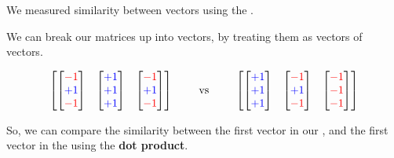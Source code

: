         We measured similarity between vectors using the .

        We can break our matrices up into vectors, by treating them as vectors of vectors.

        \begin{equation}
            \begin{bmatrix}
                \begin{bmatrix}
                    \textcolor{red}{-1} \\ \textcolor{blue}{+1} \\ \textcolor{red}{-1}
                \end{bmatrix} & 
                \begin{bmatrix}
                    \textcolor{blue}{+1} \\ \textcolor{blue}{+1} \\ \textcolor{blue}{+1}
                \end{bmatrix} & 
                \begin{bmatrix}
                    \textcolor{red}{-1} \\ \textcolor{blue}{+1} \\ \textcolor{red}{-1} 
                \end{bmatrix} 
            \end{bmatrix}
            \qquad\text{ vs } \qquad
            \begin{bmatrix}
                \begin{bmatrix}
                    \textcolor{blue}{+1} \\ \textcolor{blue}{+1} \\ \textcolor{blue}{+1}
                \end{bmatrix} & 
                \begin{bmatrix}
                    \textcolor{red}{-1} \\ \textcolor{blue}{+1} \\ \textcolor{red}{-1} 
                \end{bmatrix} & 
                \begin{bmatrix}
                    \textcolor{red}{-1} \\ \textcolor{red}{-1} \\ \textcolor{red}{-1} 
                \end{bmatrix} 
            \end{bmatrix}
        \end{equation}

        So, we can compare the similarity between the first vector in our , and the first vector in the  using the \textbf{dot product}.\\

